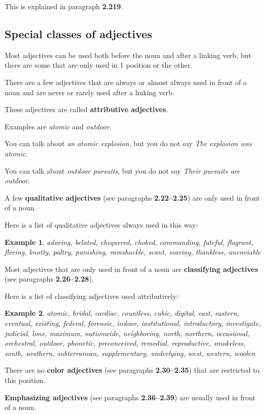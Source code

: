 \documentclass[oneside]{book}
\numberwithin{equation}{section}
\newtheorem{example}{Example}[section]
\begin{document}
This is explained in paragraph \textbf{2.219}.

\subsection{Special classes of adjectives}
\noindent{} Most adjectives can be used both before the noun and after a linking verb, but there are some that are only used in 1 position or the other.

%
There are a few adjectives that are always or almost always used in front of a noun and are never or rarely used after a linking verb.

These adjectives are called \textbf{attributive adjectives}.

%
Examples are \textit{atomic} and \textit{outdoor}.

You can talk about \textit{an atomic explosion}, but you do not say \textit{The explosion was atomic}.

You can talk about \textit{outdoor pursuits}, but you do not say \textit{Their pursuits are outdoor}.

%
\noindent{} A few \textbf{qualitative adjectives} (see paragraphs \textbf{2.22--2.25}) are only used in front of a noun.

Here is a list of qualitative adjectives always used in this way:
\begin{example}
    adoring, belated, chequered, choked, commanding, fateful, flagrant, fleeing, knotty, paltry, punishing, ramshackle, scant, searing, thankless, unenviable
\end{example}
Most adjectives that are only used in front of a noun are \textbf{classifying adjectives} (see paragraphs \textbf{2.26--2.28}).

Here is a list of classifying adjectives used attributively:
\begin{example}
    atomic, bridal, cardiac, countless, cubic, digital, east, eastern, eventual, existing, federal, forensic, indoor, institutional, introductory, investigate, judicial, lone, maximum, nationwide, neighboring, north, northern, occasional, orchestral, outdoor, phonetic, preconceived, remedial, reproductive, smokeless, south, southern, subterranean, supplementary, underlying, west, western, woolen
\end{example}
%
\noindent{} There are no \textbf{color adjectives} (see paragraphs \textbf{2.30--2.35}) that are restricted to this position.

%
\textbf{Emphasizing adjectives} (see paragraphs \textbf{2.36--2.39}) are usually used in front of a noun.
\end{document}
